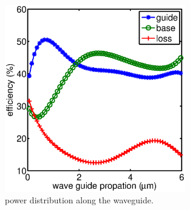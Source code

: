 \begin{figure}[!ht]
\centering
\includegraphics[width=0.7\textwidth]{bilder/power_distribution}
\caption{power distribution along the waveguide.}
\label{fig:power_distribution}
\end{figure}
